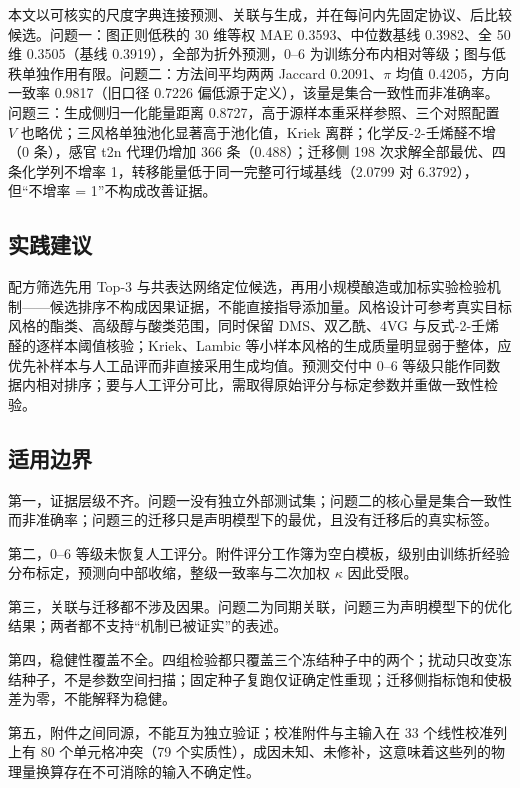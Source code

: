 \documentclass[11pt,a4paper]{article}
\begin{document}
本文以可核实的尺度字典连接预测、关联与生成，并在每问内先固定协议、后比较候选。问题一：图正则低秩的
30 维等权 MAE 0.3593、中位数基线 0.3982、全 50 维 0.3505（基线
0.3919），全部为折外预测，0--6
为训练分布内相对等级；图与低秩单独作用有限。问题二：方法间平均两两
Jaccard 0.2091、\(\pi\) 均值 0.4205，方向一致率 0.9817（旧口径 0.7226
偏低源于定义），该量是集合一致性而非准确率。问题三：生成侧归一化能量距离
0.8727，高于源样本重采样参照、三个对照配置 \(V\)
也略优；三风格单独池化显著高于池化值，Kriek 离群；化学反-2-壬烯醛不增（0
条），感官 t2n 代理仍增加 366 条（0.488）；迁移侧 198
次求解全部最优、四条化学列不增率
1，转移能量低于同一完整可行域基线（2.0799 对 6.3792），但``不增率 =
1''不构成改善证据。

\subsection{实践建议}\label{ux5b9eux8df5ux5efaux8bae}

配方筛选先用 Top-3
与共表达网络定位候选，再用小规模酿造或加标实验检验机制------候选排序不构成因果证据，不能直接指导添加量。风格设计可参考真实目标风格的酯类、高级醇与酸类范围，同时保留
DMS、双乙酰、4VG 与反式-2-壬烯醛的逐样本阈值核验；Kriek、Lambic
等小样本风格的生成质量明显弱于整体，应优先补样本与人工品评而非直接采用生成均值。预测交付中
0--6
等级只能作同数据内相对排序；要与人工评分可比，需取得原始评分与标定参数并重做一致性检验。

\subsection{适用边界}\label{ux9002ux7528ux8fb9ux754c}

第一，证据层级不齐。问题一没有独立外部测试集；问题二的核心量是集合一致性而非准确率；问题三的迁移只是声明模型下的最优，且没有迁移后的真实标签。

第二，0--6
等级未恢复人工评分。附件评分工作簿为空白模板，级别由训练折经验分布标定，预测向中部收缩，整级一致率与二次加权
\(\kappa\) 因此受限。

第三，关联与迁移都不涉及因果。问题二为同期关联，问题三为声明模型下的优化结果；两者都不支持``机制已被证实''的表述。

第四，稳健性覆盖不全。四组检验都只覆盖三个冻结种子中的两个；扰动只改变冻结种子，不是参数空间扫描；固定种子复跑仅证确定性重现；迁移侧指标饱和使极差为零，不能解释为稳健。

第五，附件之间同源，不能互为独立验证；校准附件与主输入在 33
个线性校准列上有 80 个单元格冲突（79
个实质性），成因未知、未修补，这意味着这些列的物理量换算存在不可消除的输入不确定性。
\end{document}
